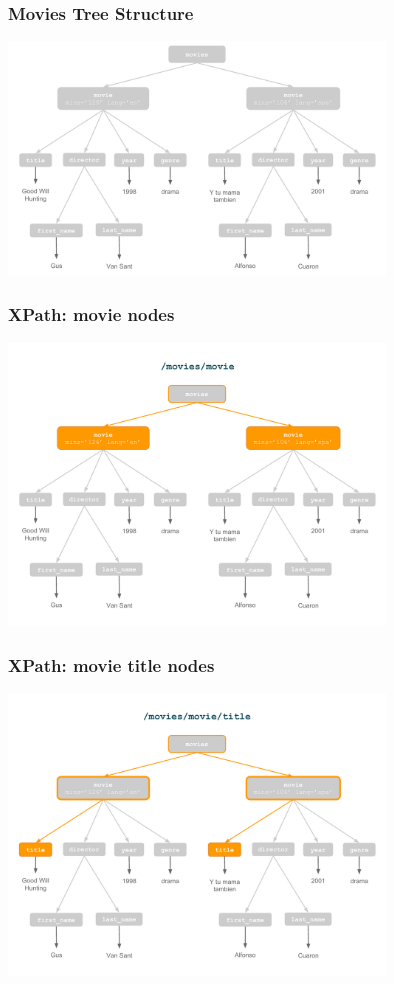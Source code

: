 \documentclass[svgnames]{beamer}
\begin{document}
\begin{frame}
\frametitle{Movies Tree Structure}
\begin{center}
\includegraphics[width=10cm]{xpath_tree.pdf}
\end{center}
\end{frame}


\begin{frame}
\frametitle{XPath: movie nodes}
\begin{center}
\includegraphics[width=10cm]{xpath_movie.pdf}
\end{center}
\end{frame}


\begin{frame}
\frametitle{XPath: movie title nodes}
\begin{center}
\includegraphics[width=10cm]{xpath_title.pdf}
\end{center}
\end{frame}
\end{document}
